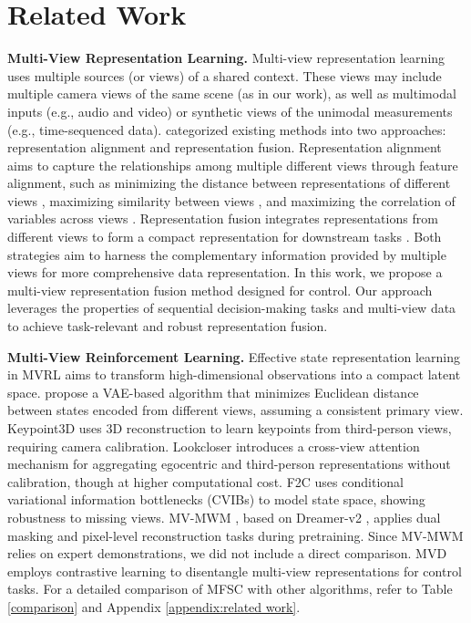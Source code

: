 \section{Related Work}
\textbf{Multi-View Representation Learning.} Multi-view representation learning uses multiple sources (or views) of a shared context. These views may include multiple camera views of the same scene (as in our work), as well as multimodal inputs (e.g., audio and video) or synthetic views of the unimodal measurements (e.g., time-sequenced data). \citet{li2018survey} categorized existing methods into two approaches: representation alignment and representation fusion. Representation alignment aims to capture the relationships among multiple different views through feature alignment, such as minimizing the distance between representations of different views \cite{feng2014cross, li2003multimedia}, maximizing similarity between views \cite{bachman2019learning, frome2013devise}, and maximizing the correlation of variables across views \cite{andrew2013deep}. Representation fusion integrates representations from different views to form a compact representation for downstream tasks \cite{geng2022multimodal, xie2020joint, karpathy2015deep}. Both strategies aim to harness the complementary information provided by multiple views for more comprehensive data representation. In this work, we propose a multi-view representation fusion method designed for control. Our approach leverages the properties of sequential decision-making tasks and multi-view data to achieve task-relevant and robust representation fusion.

\textbf{Multi-View Reinforcement Learning.} Effective state representation learning in MVRL aims to transform high-dimensional observations into a compact latent space. \citet{mvrl} propose a VAE-based algorithm that minimizes Euclidean distance between states encoded from different views, assuming a consistent primary view. Keypoint3D \cite{keypoint} uses 3D reconstruction to learn keypoints from third-person views, requiring camera calibration. Lookcloser \cite{lookcloser} introduces a cross-view attention mechanism for aggregating egocentric and third-person representations without calibration, though at higher computational cost. F2C \cite{f2c} uses conditional variational information bottlenecks (CVIBs) to model state space, showing robustness to missing views. MV-MWM \cite{mvmwm}, based on Dreamer-v2 \cite{Dreamer-v2}, applies dual masking and pixel-level reconstruction tasks during pretraining. Since MV-MWM relies on expert demonstrations, we did not include a direct comparison.  MVD \cite{mvd} employs contrastive learning to disentangle multi-view representations for control tasks. For a detailed comparison of MFSC with other algorithms, refer to Table \ref{comparison} and Appendix \ref{appendix:related work}.